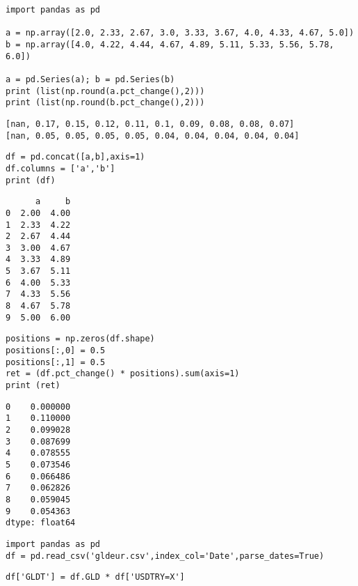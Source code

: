 \documentclass[12pt,fleqn]{article}\usepackage{../../common}
\begin{document}
\begin{verbatim}
import pandas as pd

a = np.array([2.0, 2.33, 2.67, 3.0, 3.33, 3.67, 4.0, 4.33, 4.67, 5.0])
b = np.array([4.0, 4.22, 4.44, 4.67, 4.89, 5.11, 5.33, 5.56, 5.78, 6.0])

a = pd.Series(a); b = pd.Series(b)
print (list(np.round(a.pct_change(),2)))
print (list(np.round(b.pct_change(),2)))
\end{verbatim}

\begin{verbatim}
[nan, 0.17, 0.15, 0.12, 0.11, 0.1, 0.09, 0.08, 0.08, 0.07]
[nan, 0.05, 0.05, 0.05, 0.05, 0.04, 0.04, 0.04, 0.04, 0.04]
\end{verbatim}


\begin{verbatim}
df = pd.concat([a,b],axis=1)
df.columns = ['a','b']
print (df)
\end{verbatim}

\begin{verbatim}
      a     b
0  2.00  4.00
1  2.33  4.22
2  2.67  4.44
3  3.00  4.67
4  3.33  4.89
5  3.67  5.11
6  4.00  5.33
7  4.33  5.56
8  4.67  5.78
9  5.00  6.00
\end{verbatim}

\begin{verbatim}
positions = np.zeros(df.shape)
positions[:,0] = 0.5
positions[:,1] = 0.5
ret = (df.pct_change() * positions).sum(axis=1)
print (ret)
\end{verbatim}

\begin{verbatim}
0    0.000000
1    0.110000
2    0.099028
3    0.087699
4    0.078555
5    0.073546
6    0.066486
7    0.062826
8    0.059045
9    0.054363
dtype: float64
\end{verbatim}






















\begin{verbatim}
import pandas as pd
df = pd.read_csv('gldeur.csv',index_col='Date',parse_dates=True)
\end{verbatim}


\begin{verbatim}
df['GLDT'] = df.GLD * df['USDTRY=X']
\end{verbatim}
\end{document}
